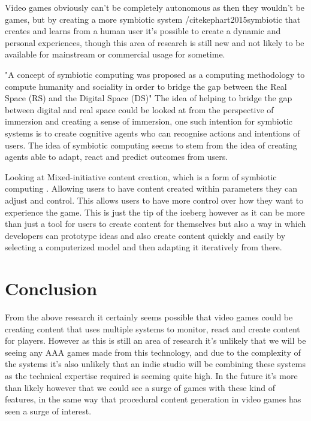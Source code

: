 \documentclass{scrartcl}
\begin{document}
Video games obviously can't be completely autonomous as then they wouldn't be games, but by creating a more symbiotic system /cite{kephart2015symbiotic} that creates and learns from a human user it's possible to create a dynamic and personal experiences, though this area of research is still new and not likely to be available for mainstream or commercial usage for sometime. 

"A concept of symbiotic computing was proposed as a computing methodology to compute humanity and sociality in order to bridge the gap between the Real Space (RS) and the Digital Space (DS)" \cite{sugawara2008design} The idea of helping to bridge the gap between digital and real space could be looked at from the perspective of immersion and creating a sense of immersion, one such intention for symbiotic systems is to create cognitive agents who can recognise actions and intentions of users. The idea of symbiotic computing seems to stem from the idea of creating agents able to adapt, react and predict outcomes from users. 

Looking at Mixed-initiative content creation, which is a form of symbiotic computing \cite{liapis2016mixed} \cite{yannakakis2014mixed}. Allowing users to have content created within parameters they can adjust and control. This allows users to have more control over how they want to experience the game. This is just the tip of the iceberg however as it can be more than just a tool for users to create content for themselves but also a way in which developers can prototype ideas and also create content quickly and easily by selecting a computerized model and then adapting it iteratively from there.

\section{Conclusion}

From the above research it certainly seems possible that video games could be creating content that uses multiple systems to monitor, react and create content for players. However  as this is still an area of research it's unlikely that we will be seeing any AAA games made from this technology, and due to the complexity of the systems it's also unlikely that an indie studio will be combining these systems as the technical expertise required is seeming quite high. In the future it's more than likely however that we could see a surge of games with these kind of features, in the same way that procedural content generation in video games has seen a surge of interest. 



\end{document}

